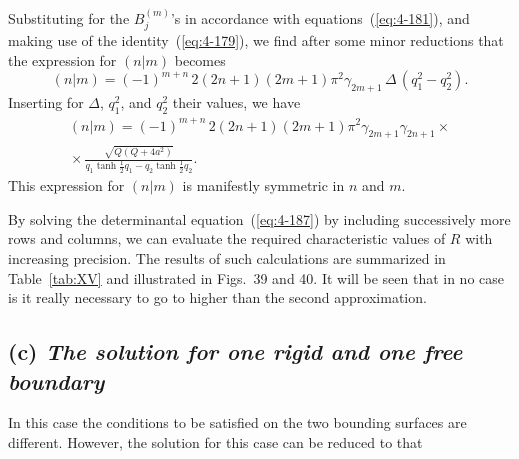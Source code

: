 Substituting for the $B_j^{(m)}$'s in accordance with equations~(\ref{eq:4-181}), and making use of the identity~(\ref{eq:4-179}), we find after some minor reductions that the expression for $(n|m)$ becomes
\begin{equation}
\label{eq:4-188}
(n|m) = (-1)^{m+n}\,2(2n+1)(2m+1)\pi^2\gamma_{2m+1}\,\Delta\,(q_1^2-q_2^2).
\end{equation}
Inserting for $\Delta$, $q_1^2$, and $q_2^2$ their values, we have
\begin{multline}
\label{eq:4-189}
(n|m) = (-1)^{m+n}\,2(2n+1)(2m+1)\pi^2\gamma_{2m+1}\gamma_{2n+1} \times {} \\
{}\times \frac{\sqrt{Q(Q+4a^2)}}{q_1\tanh\tfrac{1}{2}q_1-q_2\tanh\tfrac{1}{2}q_2}.
\end{multline}
This expression for $(n|m)$ is manifestly symmetric in $n$ and $m$.

By solving the determinantal equation~(\ref{eq:4-187}) by including successively more rows and columns, we can evaluate the required characteristic values of $R$ with increasing precision. The results of such calculations are summarized in Table~\ref{tab:XV} and illustrated in Figs.~39 and 40. It will be seen that in no case is it really necessary to go to higher than the second approximation.

\subsection*{(c) \emph{The solution for one rigid and one free boundary}}

In this case the conditions to be satisfied on the two bounding surfaces are different. However, the solution for this case can be reduced to that


